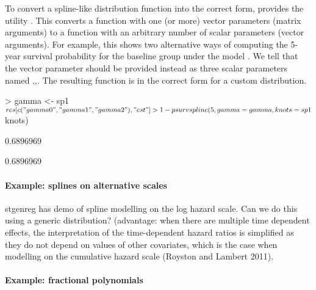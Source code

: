\documentclass[nojss,nofooter]{jss}
\begin{document}
To convert a spline-like distribution function into the correct form,
 provides the utility .  This
converts a function with one (or more) vector parameters (matrix
arguments) to a function with an arbitrary number of scalar parameters
(vector arguments).  For example, this shows two alternative ways of 
computing the 5-year survival probability for the baseline group 
under the model . We tell  that the 
vector parameter  should be provided instead as three scalar parameters
named ,,.  The resulting function 
is in the correct form for a custom  distribution.
\begin{Schunk}
\begin{Sinput}
> gamma <- sp1$res[c("gamma0","gamma1","gamma2"),"est"]
> 1 - psurvspline(5, gamma=gamma, knots=sp1$knots)
\end{Sinput}
\begin{Soutput}
[1] 0.6896969
\end{Soutput}
\begin{Soutput}
[1] 0.6896969
\end{Soutput}
\end{Schunk}


\paragraph{Example: splines on alternative scales}

stgenreg has demo of spline modelling on the log hazard scale.  Can we do this using a generic distribution? 
(advantage: when there are multiple time dependent effects, the
interpretation of the time-dependent hazard ratios is simplified as
they do not depend on values of other covariates, which is the case
when modelling on the cumulative hazard scale (Royston and Lambert
2011).

\paragraph{Example: fractional polynomials}

\end{document}
